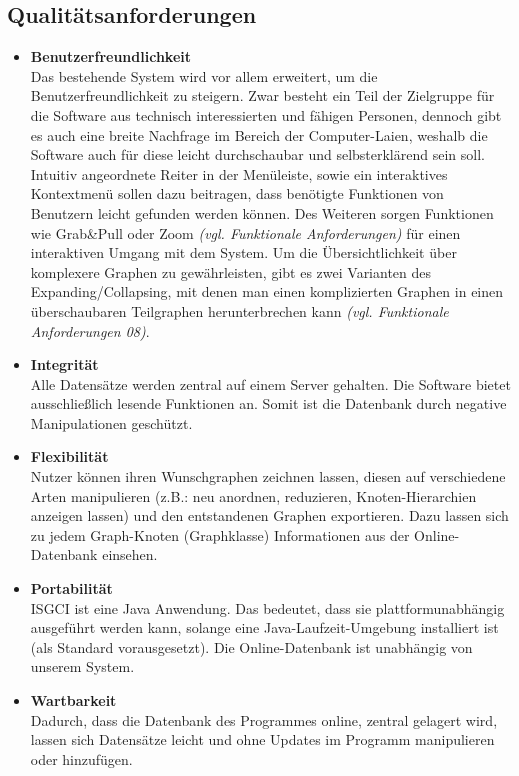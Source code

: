 \documentclass[11pt,a4paper]{article}
\begin{document}
	\subsection{Qualitätsanforderungen} %
		\begin{itemize}	
		\item \textbf{Benutzerfreundlichkeit}\\
		Das bestehende System wird vor allem erweitert, um die Benutzerfreundlichkeit zu steigern. Zwar besteht ein Teil der Zielgruppe für die Software aus technisch interessierten und fähigen Personen, dennoch gibt es auch eine breite Nachfrage im Bereich der Computer-Laien, weshalb die Software auch für diese leicht durchschaubar und selbsterklärend sein soll. Intuitiv angeordnete Reiter in der Menüleiste, sowie ein interaktives Kontextmenü sollen dazu beitragen, dass benötigte Funktionen von Benutzern leicht gefunden werden können. Des Weiteren sorgen Funktionen wie Grab\&Pull oder Zoom \textit{(vgl. Funktionale Anforderungen)} für einen interaktiven Umgang mit dem System. Um die Übersichtlichkeit über komplexere Graphen zu gewährleisten, gibt es zwei Varianten des Expanding/Collapsing, mit denen man einen komplizierten Graphen in einen überschaubaren Teilgraphen herunterbrechen kann \textit{(vgl. Funktionale Anforderungen 08)}.
		\item \textbf{Integrität}\\
		Alle Datensätze werden zentral auf einem Server gehalten. Die Software bietet ausschließlich lesende Funktionen an. Somit ist die Datenbank durch negative Manipulationen geschützt.
		\item \textbf{Flexibilität}\\
		Nutzer können ihren Wunschgraphen zeichnen lassen, diesen auf verschiedene Arten manipulieren (z.B.: neu anordnen, reduzieren, Knoten-Hierarchien anzeigen lassen) und den entstandenen Graphen exportieren. Dazu lassen sich zu jedem Graph-Knoten (Graphklasse) Informationen aus der Online-Datenbank einsehen. 
		\item \textbf{Portabilität}\\
		ISGCI ist eine Java Anwendung. Das bedeutet, dass sie plattformunabhängig ausgeführt werden kann, solange eine Java-Laufzeit-Umgebung installiert ist (als Standard vorausgesetzt).
		Die Online-Datenbank ist unabhängig von unserem System. 
		\item \textbf{Wartbarkeit}\\
		Dadurch, dass die Datenbank des Programmes online, zentral gelagert wird, lassen sich Datensätze leicht und ohne Updates im Programm manipulieren oder hinzufügen.
		\end{itemize}
		
\end{document}
